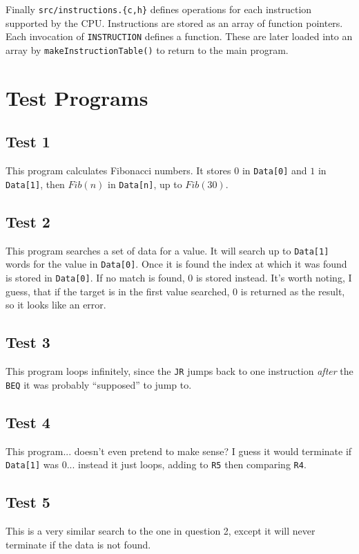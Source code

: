 \documentclass[11pt,letterpaper]{article}
\begin{document}
Finally \texttt{src/instructions.\{c,h\}} defines operations for each instruction supported by the CPU. Instructions are stored as an array of function pointers. Each invocation of \texttt{INSTRUCTION} defines a function. These are later loaded into an array by \texttt{makeInstructionTable()} to return to the main program.

\newpage

\section{Test Programs}
\subsection{Test 1}
This program calculates Fibonacci numbers. It stores $0$ in \texttt{Data[0]} and $1$ in \texttt{Data[1]}, then $Fib(n)$ in \texttt{Data[n]}, up to $Fib(30)$.

\subsection{Test 2}
This program searches a set of data for a value. It will search up to \texttt{Data[1]} words for the value in \texttt{Data[0]}. Once it is found the index at which it was found is stored in \texttt{Data[0]}. If no match is found, $0$ is stored instead. It's worth noting, I guess, that if the target is in the first value searched, $0$ is returned as the result, so it looks like an error.

\subsection{Test 3}
This program loops infinitely, since the \texttt{JR} jumps back to one instruction \textit{after} the \texttt{BEQ} it was probably ``supposed'' to jump to.

\subsection{Test 4}
This program... doesn't even pretend to make sense? I guess it would terminate if \texttt{Data[1]} was $0$... instead it just loops, adding to \texttt{R5} then comparing \texttt{R4}.

\subsection{Test 5}
This is a very similar search to the one in question 2, except it will never terminate if the data is not found.
\end{document}

